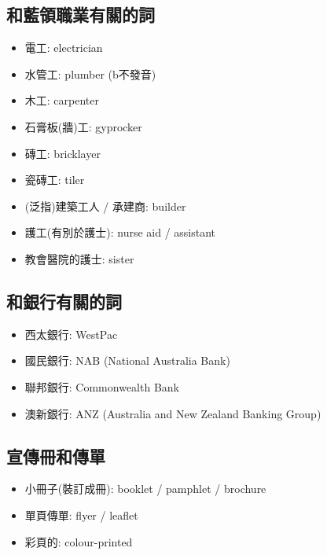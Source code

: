 \subsection{和藍領職業有關的詞}
\begin{multicols}{2}
\begin{itemize}
  \itemsep0em
  \item 電工: electrician
  \item 水管工: plumber (b不發音)
  \item 木工: carpenter
  \item 石膏板(牆)工: gyprocker
  \item 磚工: bricklayer
  \item 瓷磚工: tiler
  \item (泛指)建築工人 / 承建商: builder
  \item 護工(有別於護士): nurse aid / assistant
  \item 教會醫院的護士: sister
\end{itemize}
\end{multicols}

\subsection{和銀行有關的詞}
\begin{itemize}
  \itemsep0em
  \item 西太銀行: WestPac
  \item 國民銀行: NAB (National Australia Bank)
  \item 聯邦銀行: Commonwealth Bank
  \item 澳新銀行: ANZ (Australia and New Zealand Banking Group)
\end{itemize}

\subsection{宣傳冊和傳單}
\begin{itemize}
  \itemsep0em
  \item 小冊子(裝訂成冊): booklet / pamphlet / brochure
  \item 單頁傳單: flyer / leaflet
  \item 彩頁的: colour-printed
\end{itemize}

